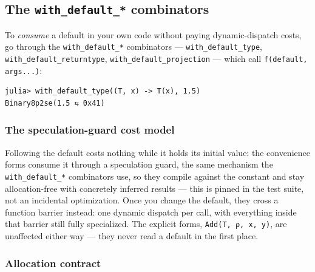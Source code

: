\subsection{The \texttt{with\_\allowbreak{}default\_\allowbreak{}*} combinators}



\label{6052462280974839264}{}


To \emph{consume} a default in your own code without paying dynamic-dispatch costs, go through the \texttt{with\_\allowbreak{}default\_\allowbreak{}*} combinators — \texttt{with\_\allowbreak{}default\_\allowbreak{}type}, \texttt{with\_\allowbreak{}default\_\allowbreak{}returntype}, \texttt{with\_\allowbreak{}default\_\allowbreak{}projection} — which call \texttt{f(default, args...)}:




\nopagebreak[4]
\begin{verbatim}
julia> with_default_type((T, x) -> T(x), 1.5)
Binary8p2se(1.5 ⇆ 0x41)
\end{verbatim}



\subsubsection{The speculation-guard cost model}



\label{6559940910047111362}{}


Following the default costs nothing while it holds its initial value: the convenience forms consume it through a speculation guard, the same mechanism the \texttt{with\_\allowbreak{}default\_\allowbreak{}*} combinators use, so they compile against the constant and stay allocation-free with concretely inferred results — this is pinned in the test suite, not an incidental optimization. Once you change the default, they cross a function barrier instead: one dynamic dispatch per call, with everything inside that barrier still fully specialized. The explicit forms, \texttt{Add(T, ρ, x, y)}, are unaffected either way — they never read a default in the first place.



\subsubsection{Allocation contract}



\label{8451993120491484882}{}


